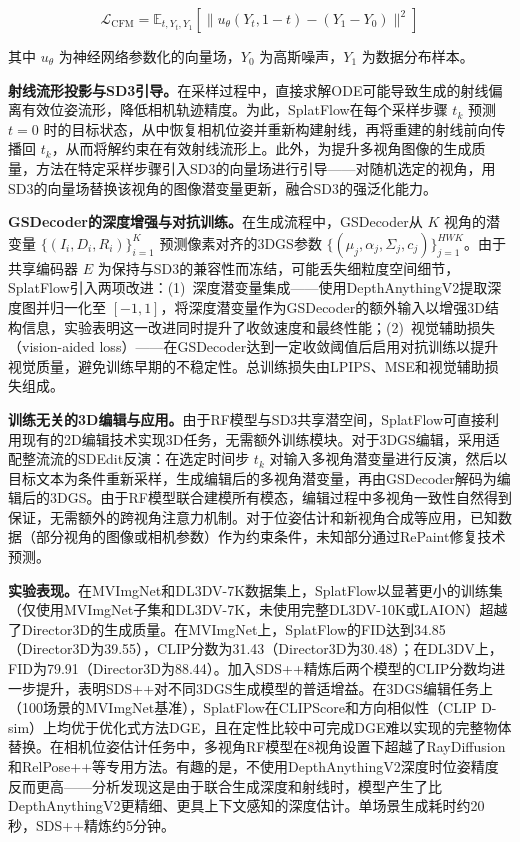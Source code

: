 \begin{equation}
\mathcal{L}_{\text{CFM}} = \mathbb{E}_{t, Y_t, Y_1} \left[ \| u_\theta(Y_t, 1-t) - (Y_1 - Y_0) \|^2 \right]
\end{equation}

其中 $u_\theta$ 为神经网络参数化的向量场，$Y_0$ 为高斯噪声，$Y_1$ 为数据分布样本。

\textbf{射线流形投影与SD3引导。}在采样过程中，直接求解ODE可能导致生成的射线偏离有效位姿流形，降低相机轨迹精度。为此，SplatFlow在每个采样步骤 $t_k$ 预测 $t=0$ 时的目标状态，从中恢复相机位姿并重新构建射线，再将重建的射线前向传播回 $t_k$，从而将解约束在有效射线流形上。此外，为提升多视角图像的生成质量，方法在特定采样步骤引入SD3的向量场进行引导——对随机选定的视角，用SD3的向量场替换该视角的图像潜变量更新，融合SD3的强泛化能力。

\textbf{GSDecoder的深度增强与对抗训练。}在生成流程中，GSDecoder从 $K$ 视角的潜变量 $\{(I_i, D_i, R_i)\}_{i=1}^K$ 预测像素对齐的3DGS参数 $\{(\mu_j, \alpha_j, \Sigma_j, c_j)\}_{j=1}^{HWK}$。由于共享编码器 $E$ 为保持与SD3的兼容性而冻结，可能丢失细粒度空间细节，SplatFlow引入两项改进：(1)~深度潜变量集成——使用DepthAnythingV2提取深度图并归一化至 $[-1, 1]$，将深度潜变量作为GSDecoder的额外输入以增强3D结构信息，实验表明这一改进同时提升了收敛速度和最终性能；(2)~视觉辅助损失（vision-aided loss）——在GSDecoder达到一定收敛阈值后启用对抗训练以提升视觉质量，避免训练早期的不稳定性。总训练损失由LPIPS、MSE和视觉辅助损失组成。

\textbf{训练无关的3D编辑与应用。}由于RF模型与SD3共享潜空间，SplatFlow可直接利用现有的2D编辑技术实现3D任务，无需额外训练模块。对于3DGS编辑，采用适配整流流的SDEdit反演：在选定时间步 $t_k$ 对输入多视角潜变量进行反演，然后以目标文本为条件重新采样，生成编辑后的多视角潜变量，再由GSDecoder解码为编辑后的3DGS。由于RF模型联合建模所有模态，编辑过程中多视角一致性自然得到保证，无需额外的跨视角注意力机制。对于位姿估计和新视角合成等应用，已知数据（部分视角的图像或相机参数）作为约束条件，未知部分通过RePaint修复技术预测。

\textbf{实验表现。}在MVImgNet和DL3DV-7K数据集上，SplatFlow以显著更小的训练集（仅使用MVImgNet子集和DL3DV-7K，未使用完整DL3DV-10K或LAION）超越了Director3D的生成质量。在MVImgNet上，SplatFlow的FID达到34.85（Director3D为39.55），CLIP分数为31.43（Director3D为30.48）；在DL3DV上，FID为79.91（Director3D为88.44）。加入SDS++精炼后两个模型的CLIP分数均进一步提升，表明SDS++对不同3DGS生成模型的普适增益。在3DGS编辑任务上（100场景的MVImgNet基准），SplatFlow在CLIPScore和方向相似性（CLIP D-sim）上均优于优化式方法DGE，且在定性比较中可完成DGE难以实现的完整物体替换。在相机位姿估计任务中，多视角RF模型在8视角设置下超越了RayDiffusion和RelPose++等专用方法。有趣的是，不使用DepthAnythingV2深度时位姿精度反而更高——分析发现这是由于联合生成深度和射线时，模型产生了比DepthAnythingV2更精细、更具上下文感知的深度估计。单场景生成耗时约20秒，SDS++精炼约5分钟。

